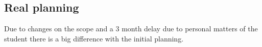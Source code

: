 %
%
%
%






\subsection{Real planning}
Due to changes on the scope and a 3 month delay due to personal matters of the student there is a big difference with the initial planning.

\newcommand{\PStart}{2018-11-01}
\newcommand{\FBeginning}{2018-11-07}
\newcommand{\SIncrementoUnoDosInicial}{2018-11-08}
\newcommand{\FIncrementoUnoDosInicial}{2018-12-05}
\newcommand{\FPause}{2019-03-01}
\newcommand{\FComeback}{2019-03-03}
\newcommand{\FIncrementoUnoDosFinal}{2019-04-15}
\newcommand{\SClosing}{2019-06-29}
\newcommand{\PClosing}{2019-07-17}


